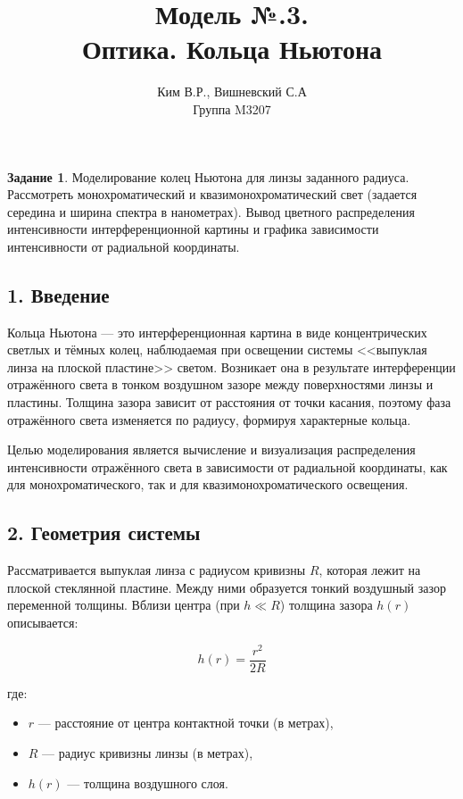 \documentclass[a4paper,11pt]{article}
\title{Модель №.3. \\ Оптика. Кольца Ньютона }
\author{Ким В.Р., Вишневский С.А \\ Группа M3207 }
\date{}
\theoremstyle{definition}
\newtheorem*{task}{Задание}\setlength{\parindent}{0pt}
\begin{document}
\maketitle

\begin{task}
    Моделирование колец Ньютона для линзы заданного радиуса. 
    Рассмотреть монохроматический и квазимонохроматический свет 
    (задается середина и ширина спектра в нанометрах). Вывод цветного 
    распределения интенсивности интерференционной картины и графика
    зависимости интенсивности от радиальной координаты.
\end{task}





\subsection*{1. Введение}
Кольца Ньютона — это интерференционная картина в виде концентрических светлых 
и тёмных колец, наблюдаемая при освещении системы <<выпуклая линза на плоской пластине>> светом. 
Возникает она в результате интерференции отражённого света в тонком воздушном зазоре между 
поверхностями линзы и пластины. Толщина зазора зависит от расстояния от точки касания, 
поэтому фаза отражённого света изменяется по радиусу, формируя характерные кольца.

Целью моделирования является вычисление и визуализация распределения интенсивности отражённого света 
в зависимости от радиальной координаты, как для монохроматического, так и для квазимонохроматического 
освещения.



\subsection*{2. Геометрия системы}
Рассматривается выпуклая линза с радиусом кривизны \( R \), которая лежит 
на плоской стеклянной пластине. Между ними образуется тонкий воздушный зазор переменной 
толщины. Вблизи центра (при \( h \ll R \)) толщина зазора \( h(r) \) описывается:

\[
h(r) = \frac{r^2}{2R}
\]

где:
\begin{itemize}
  \item \( r \) — расстояние от центра контактной точки (в метрах),
  \item \( R \) — радиус кривизны линзы (в метрах),
  \item \( h(r) \) — толщина воздушного слоя.
\end{itemize}
\end{document}
